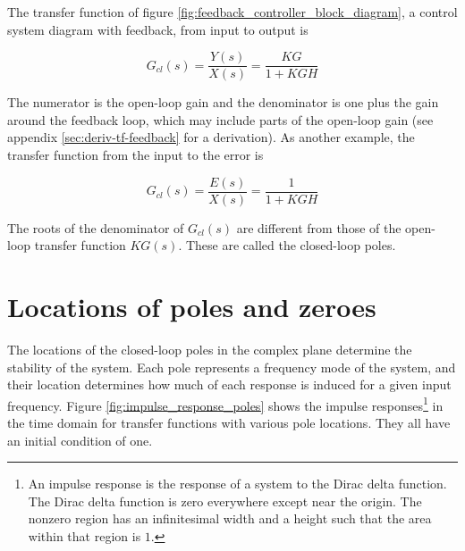 The transfer function of figure \ref{fig:feedback_controller_block_diagram}, a
control system diagram with feedback, from input to output is

\begin{equation}
  G_{cl}(s) = \frac{Y(s)}{X(s)} = \frac{KG}{1 + KGH}
\end{equation}

The numerator is the \gls{open-loop gain} and the denominator is one plus the
gain around the feedback loop, which may include parts of the
\gls{open-loop gain} (see appendix \ref{sec:deriv-tf-feedback} for a
derivation). As another example, the transfer function from the input to the
error is

\begin{equation}
  G_{cl}(s) = \frac{E(s)}{X(s)} = \frac{1}{1 + KGH}
\end{equation}

The roots of the denominator of $G_{cl}(s)$ are different from those of the
open-loop transfer function $KG(s)$. These are called the closed-loop poles.

\section{Locations of poles and zeroes}

The locations of the closed-loop poles in the complex plane determine the
stability of the \gls{system}. Each pole represents a frequency mode of the
\gls{system}, and their location determines how much of each response is induced
for a given input frequency. Figure \ref{fig:impulse_response_poles} shows the
impulse responses\footnote{An impulse response is the response of a \gls{system}
to the Dirac delta function. The Dirac delta function is zero everywhere except
near the origin. The nonzero region has an infinitesimal width and a height such
that the area within that region is $1$.} in the time domain for transfer
functions with various pole locations. They all have an initial condition of
one.

